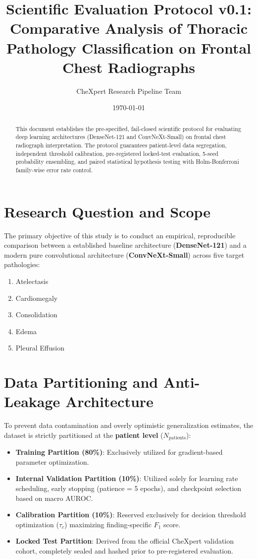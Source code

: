 \documentclass[11pt,a4paper]{article}
\title{\textbf{Scientific Evaluation Protocol v0.1: Comparative Analysis of Thoracic Pathology Classification on Frontal Chest Radiographs}}
\author{CheXpert Research Pipeline Team}
\date{\today}
\begin{document}
\maketitle

\begin{abstract}
This document establishes the pre-specified, fail-closed scientific protocol for evaluating deep learning architectures (DenseNet-121 and ConvNeXt-Small) on frontal chest radiograph interpretation. The protocol guarantees patient-level data segregation, independent threshold calibration, pre-registered locked-test evaluation, 5-seed probability ensembling, and paired statistical hypothesis testing with Holm-Bonferroni family-wise error rate control.
\end{abstract}

\section{Research Question and Scope}
\label{sec:research_question}
The primary objective of this study is to conduct an empirical, reproducible comparison between a established baseline architecture (\textbf{DenseNet-121}) and a modern pure convolutional architecture (\textbf{ConvNeXt-Small}) across five target pathologies:
\begin{enumerate}
    \item Atelectasis
    \item Cardiomegaly
    \item Consolidation
    \item Edema
    \item Pleural Effusion
\end{enumerate}

\section{Data Partitioning and Anti-Leakage Architecture}
\label{sec:data_partitioning}
To prevent data contamination and overly optimistic generalization estimates, the dataset is strictly partitioned at the \textbf{patient level} ($N_{\text{patients}}$):
\begin{itemize}
    \item \textbf{Training Partition (80\%)}: Exclusively utilized for gradient-based parameter optimization.
    \item \textbf{Internal Validation Partition (10\%)}: Utilized solely for learning rate scheduling, early stopping (patience = 5 epochs), and checkpoint selection based on macro AUROC.
    \item \textbf{Calibration Partition (10\%)}: Reserved exclusively for decision threshold optimization ($\tau_c$) maximizing finding-specific $F_1$ score.
    \item \textbf{Locked Test Partition}: Derived from the official CheXpert validation cohort, completely sealed and hashed prior to pre-registered evaluation.
\end{itemize}
\end{document}
